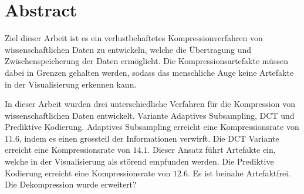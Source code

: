 \section*{Abstract}
Ziel dieser Arbeit ist es ein verlustbehaftetes Kompressionverfahren von wissenschaftlichen Daten zu entwickeln, welche die Übertragung und Zwischenspeicherung der Daten ermöglicht. Die Kompressionsartefakte müssen dabei in Grenzen gehalten werden, sodass das menschliche Auge keine Artefakte in der Visualisierung erkennen kann.

In dieser Arbeit wurden drei unterschiedliche Verfahren für die Kompression von wissenschaftlichen Daten entwickelt. Variante Adaptives Subsampling, DCT und Prediktive Kodierung.
Adaptives Subsampling erreicht eine Kompressionsrate von $11.6$, indem es einen grossteil der Informationen verwirft.
Die DCT Variante erreicht eine Kompressionsrate von $14.1$. Dieser Ansatz führt Artefakte ein, welche in der Visualisierung als störend empfunden werden.
Die Prediktive Kodierung erreicht eine Kompressionsrate von $12.6$. Es ist beinahe Artefaktfrei.
Die Dekompression wurde erweitert?